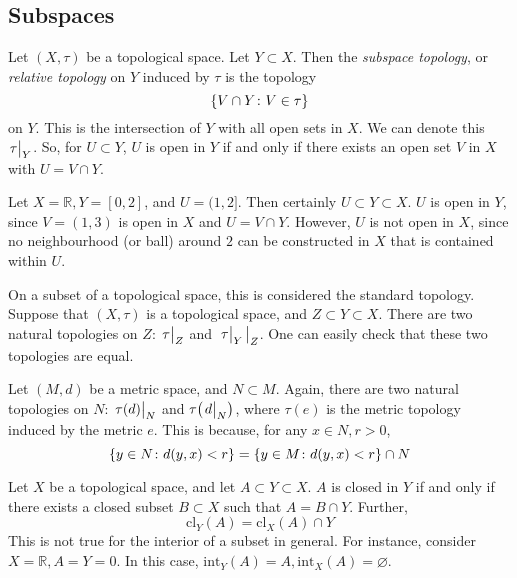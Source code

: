 \subsection{Subspaces}
\begin{definition}
	Let \( (X, \tau) \) be a topological space.
	Let \( Y \subset X \).
	Then the \textit{subspace topology}, or \textit{relative topology} on \( Y \) induced by \( \tau \) is the topology
	\[ \qty{ V \cap Y \colon V \in \tau } \]
	on \( Y \).
	This is the intersection of \( Y \) with all open sets in \( X \).
	We can denote this \( \eval{\tau}_Y \).
	So, for \( U \subset Y \), \( U \) is open in \( Y \) if and only if there exists an open set \( V \) in \( X \) with \( U = V \cap Y \).
\end{definition}
\begin{example}
	Let \( X = \mathbb R, Y = [0,2] \), and \( U = (1,2] \).
	Then certainly \( U \subset Y \subset X \).
	\( U \) is open in \( Y \), since \( V = (1,3) \) is open in \( X \) and \( U = V \cap Y \).
	However, \( U \) is not open in \( X \), since no neighbourhood (or ball) around \( 2 \) can be constructed in \( X \) that is contained within \( U \).
\end{example}
\begin{remark}
	On a subset of a topological space, this is considered the standard topology.
	Suppose that \( (X, \tau) \) is a topological space, and \( Z \subset Y \subset X \).
	There are two natural topologies on \( Z \): \( \eval{\tau}_Z \) and \( \eval{\eval{\tau}_Y}_Z \).
	One can easily check that these two topologies are equal.

	Let \( (M,d) \) be a metric space, and \( N \subset M \).
	Again, there are two natural topologies on \( N \): \( \eval{\tau(d)}_N \) and \( \tau\qty(\eval{d}_N) \), where \( \tau(e) \) is the metric topology induced by the metric \( e \).
	This is because, for any \( x \in N, r > 0 \),
	\[ \qty{y \in N \colon d(y,x) < r} = \qty{y \in M \colon d(y,x) < r} \cap N \]
\end{remark}
\begin{proposition}
	Let \( X \) be a topological space, and let \( A \subset Y \subset X \).
	\( A \) is closed in \( Y \) if and only if there exists a closed subset \( B \subset X \) such that \( A = B \cap Y \).
	Further,
	\[ \mathrm{cl}_Y(A) = \mathrm{cl}_X(A) \cap Y \]
	This is not true for the interior of a subset in general.
	For instance, consider \( X = \mathbb R, A = Y = \qty{0} \).
	In this case, \( \mathrm{int}_Y(A) = A, \mathrm{int}_X(A) = \varnothing \).
\end{proposition}
